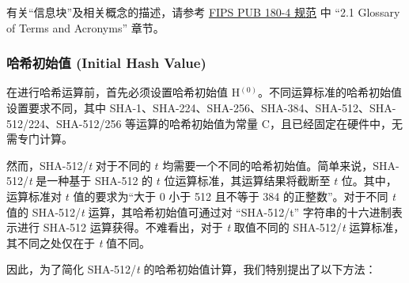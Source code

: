 \documentclass[main\_\_CN.tex]{subfiles}
\begin{document}
\begin{tiplisting}
有关“信息块”及相关概念的描述，请参考 \href{https://doi.org/10.6028/NIST.FIPS.180-4}{FIPS PUB 180-4 规范} 中 “2.1 Glossary of Terms and Acronyms” 章节。
\end{tiplisting}

\subsubsection{哈希初始值 (Initial Hash Value)}\label{sec:sha-set-initial-hash}
在进行哈希运算前，首先必须设置哈希初始值 H$^{(0)}$。不同运算标准的哈希初始值设置要求不同，其中 SHA-1、SHA-224、SHA-256、SHA-384、SHA-512、SHA-512/224、SHA-512/256 等运算的哈希初始值为常量 C，且已经固定在硬件中，无需专门计算。

然而，SHA-512/{\it{t}} 对于不同的 \begin{math}t\end{math} 均需要一个不同的哈希初始值。简单来说，SHA-512/{\it{t}} 是一种基于 SHA-512 的 \begin{math}t\end{math} 位运算标准，其运算结果将截断至 \begin{math}t\end{math} 位。其中，运算标准对 \begin{math}t\end{math} 值的要求为“大于 0 小于 512 且不等于 384 的正整数”。对于不同 {\it{t}} 值的 SHA-512/{\it{t}} 运算，其哈希初始值可通过对 ``SHA-512/t” 字符串的十六进制表示进行 SHA-512 运算获得。不难看出，对于 {\it{t}} 取值不同的 SHA-512/{\it{t}} 运算标准，其不同之处仅在于 {\it{t}} 值不同。

因此，为了简化 SHA-512/{\it{t}} 的哈希初始值计算，我们特别提出了以下方法：
\end{document}
